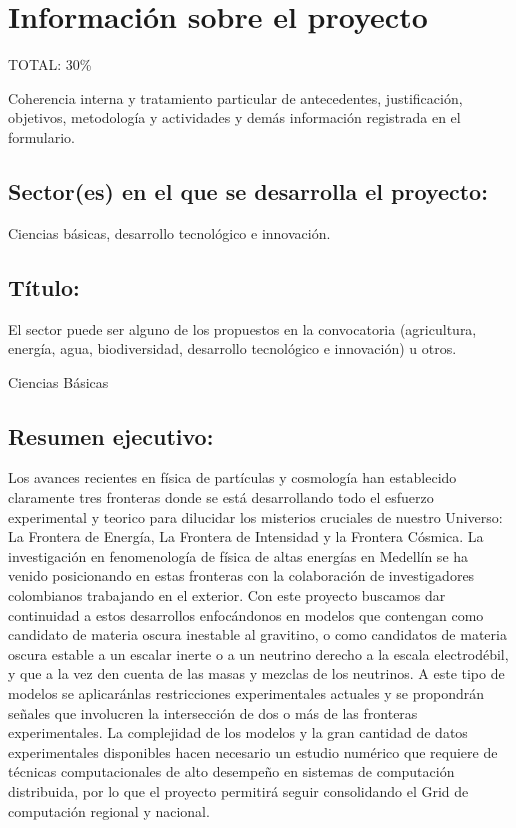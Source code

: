 
\section{Información sobre el proyecto}
\begin{evaluacion}
  TOTAL: 30\%

  Coherencia interna y tratamiento particular  de antecedentes,
  justificación, objetivos, metodología y actividades y demás
  información registrada en el formulario.
\end{evaluacion}

\subsection{Sector(es)  en el que se desarrolla el proyecto:}
Ciencias básicas, desarrollo tecnológico e innovación.
\subsection{Título:                                        }
\begin{instrucciones}
  El sector puede ser alguno de los propuestos en la convocatoria
  (agricultura, energía, agua, biodiversidad, desarrollo tecnológico e
  innovación) u otros.
\end{instrucciones}
Ciencias Básicas
\subsection{Resumen ejecutivo:                            }
Los avances recientes en física de partículas y cosmología han
establecido claramente tres fronteras donde se está desarrollando todo
el esfuerzo experimental y teorico para dilucidar los misterios cruciales de nuestro
Universo: La Frontera de Energía, La Frontera de Intensidad y la
Frontera Cósmica. La investigación en fenomenología de física de altas
energías en Medellín se ha venido posicionando en estas fronteras con
la colaboración de investigadores colombianos trabajando en el
exterior. Con este proyecto buscamos dar continuidad a estos
desarrollos enfocándonos en modelos que contengan como candidato de
materia oscura inestable al gravitino, o como candidatos de materia oscura
estable a un escalar inerte o a un neutrino derecho a la escala
electrodébil, y que a la vez den cuenta de las masas y mezclas de
los neutrinos. A este tipo de modelos se aplicaránlas  restricciones
experimentales actuales y se propondrán señales que involucren la intersección
de dos o más de las fronteras experimentales. La complejidad de los
modelos y la gran cantidad de datos experimentales disponibles hacen
necesario un estudio numérico que requiere de técnicas computacionales
de alto desempeño en sistemas de computación distribuida, por lo que el
proyecto permitirá seguir consolidando el Grid de computación regional
y nacional.

